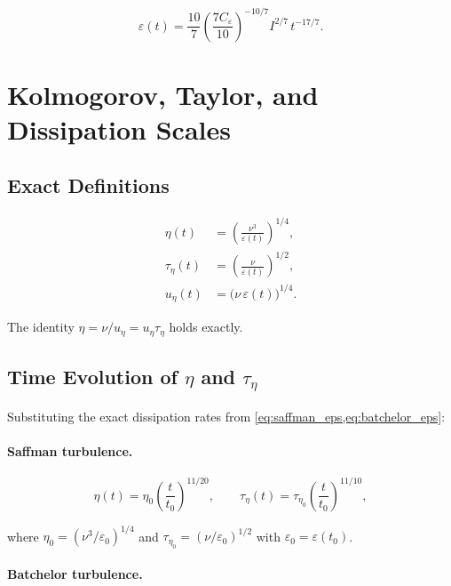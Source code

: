 \documentclass[12pt,a4paper]{article}
\newcommand{\eps}{\varepsilon}
\newcommand{\taueta}{\tau_{\eta}}
\newcommand{\tauetaz}{\tau_{\eta_0}}
\newcommand{\Ceps}{C_{\varepsilon}}
\theoremstyle{plain}
\theoremstyle{definition}
\begin{document}
\begin{equation}
  \boxed{
  \eps(t) = \frac{10}{7}\left(\frac{7\Ceps}{10}\right)^{-10/7}
            I^{2/7}\,t^{-17/7}.
  }
  \label{eq:batchelor_eps}
\end{equation}

\section{Kolmogorov, Taylor, and Dissipation Scales}
\label{sec:scales}

\subsection{Exact Definitions}

\begin{align}
  \eta(t)     &= \left(\frac{\nu^3}{\eps(t)}\right)^{1/4},
  \label{eq:eta_def}\\[6pt]
  \taueta(t)  &= \left(\frac{\nu}{\eps(t)}\right)^{1/2},
  \label{eq:taueta_def}\\[6pt]
  u_\eta(t)   &= \bigl(\nu\,\eps(t)\bigr)^{1/4}.
  \label{eq:ueta_def}
\end{align}

The identity $\eta = \nu/u_\eta = u_\eta \taueta$ holds exactly.

\subsection{Time Evolution of $\eta$ and $\taueta$}

Substituting the exact dissipation rates from
\cref{eq:saffman_eps,eq:batchelor_eps}:

\paragraph{Saffman turbulence.}

\begin{equation}
  \boxed{
  \eta(t) = \eta_0 \left(\frac{t}{t_0}\right)^{11/20},\qquad
  \taueta(t) = \tauetaz \left(\frac{t}{t_0}\right)^{11/10}, }
  \label{eq:eta_saffman}
\end{equation}

where $\eta_0 = (\nu^3/\eps_0)^{1/4}$ and $\tauetaz = (\nu/\eps_0)^{1/2}$
with $\eps_0 = \eps(t_0)$.

\paragraph{Batchelor turbulence.}
\end{document}
